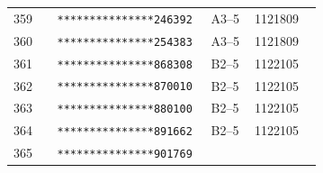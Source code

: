 \documentclass[UTF8,10pt,a4paper,fontset=fandol]{ctexart}
\newcommand{\fieldvalue}[1]{#1}
\begin{document}
\begin{center}
\begin{tabular}{|p{0.13\linewidth}|p{0.22\linewidth}|p{0.13\linewidth}|p{0.20\linewidth}|}
&\\
\hline
\fieldvalue{359}
&
\fieldvalue{\texttt{***************246392}}
&
\fieldvalue{A3--5}
&
\fieldvalue{1121809}
&\\
\hline
\fieldvalue{360}
&
\fieldvalue{\texttt{***************254383}}
&
\fieldvalue{A3--5}
&
\fieldvalue{1121809}
&\\
\hline
\fieldvalue{361}
&
\fieldvalue{\texttt{***************868308}}
&
\fieldvalue{B2--5}
&
\fieldvalue{1122105}
&\\
\hline
\fieldvalue{362}
&
\fieldvalue{\texttt{***************870010}}
&
\fieldvalue{B2--5}
&
\fieldvalue{1122105}
&\\
\hline
\fieldvalue{363}
&
\fieldvalue{\texttt{***************880100}}
&
\fieldvalue{B2--5}
&
\fieldvalue{1122105}
&\\
\hline
\fieldvalue{364}
&
\fieldvalue{\texttt{***************891662}}
&
\fieldvalue{B2--5}
&
\fieldvalue{1122105}
&\\
\hline
\fieldvalue{365}
&
\fieldvalue{\texttt{***************901769}}
&

\end{tabular}
\end{center}
\end{document}
